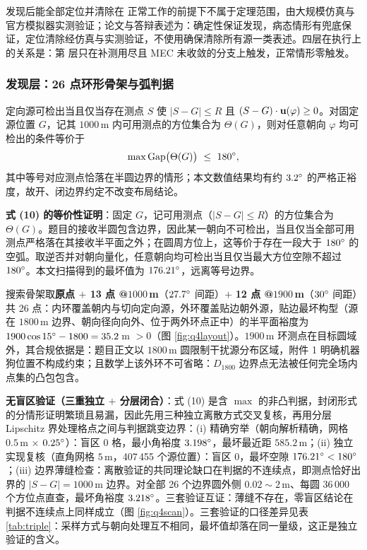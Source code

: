 \documentclass[12pt,a4paper]{ctexart}
\begin{document}
发现后能全部定位并清除在  正常工作的前提下不属于定理范围，由大规模仿真与官方模拟器实测验证；论文与答辩表述为：确定性保证发现，病态情形有兜底保证，定位清除经仿真与实测验证，不使用确保清除所有源一类表述。四层在执行上的关系是：第  层只在补测用尽且 MEC 未收敛的分支上触发，正常情形零触发。

\subsubsection{发现层：26 点环形骨架与弧判据}

定向源可检出当且仅当存在测点 $S$ 使 $|S-G|\le R$ 且 $(S-G)\cdot\mathbf{u}(\varphi)\ge 0$。对固定源位置 $G$，记其 $1000\,$m 内可用测点的方位集合为 $\Theta(G)$，则对任意朝向 $\varphi$ 均可检出的条件等价于
\begin{equation}
  \maxGap\bigl(\Theta(G)\bigr)\ \le\ 180\degr,
\end{equation}
其中等号对应测点恰落在半圆边界的情形；本文数值结果均有约 $3.2^{\circ}$ 的严格正裕度，故开、闭边界约定不改变布局结论。

\textbf{式 (10) 的等价性证明}：固定 $G$，记可用测点（$|S-G|\le R$）的方位集合为 $\Theta(G)$。题目的接收半圆包含边界，因此某一朝向不可检出，当且仅当全部可用测点严格落在其接收半平面之外；在圆周方位上，这等价于存在一段大于 $180^{\circ}$ 的空弧。取逆否并对朝向量化，任意朝向均可检出当且仅当最大方位空隙不超过 $180^{\circ}$。本文扫描得到的最坏值为 $176.21^{\circ}$，远离等号边界。

搜索骨架取\textbf{原点 $+$ 13 点 @$1000\,$m}（$27.7^{\circ}$ 间距）$+$ \textbf{12 点 @$1900\,$m}（$30^{\circ}$ 间距）共 26 点：内环覆盖朝内与切向定向源，外环覆盖贴边朝外源，贴边最坏构型（源在 $1800\,$m 边界、朝向径向向外、位于两外环点正中）的半平面裕度为 $1900\cos 15^{\circ}-1800=35.2\,$m $>0$（图 \ref{fig:q4layout}）。$1900\,$m 环测点在目标圆域外，其合规依据是：题目正文以 $1800\,$m 圆限制干扰源分布区域，附件 1 明确机器狗位置不构成约束；且数学上该外环不可省略：$D_{1800}$ 边界点无法被任何完全场内点集的凸包包含。

\textbf{无盲区验证（三重独立 $+$ 分层闭合）}：式 (10) 是含 $\max$ 的非凸判据，封闭形式的分情形证明繁琐且易漏，因此先用三种独立离散方式交叉复核，再用分层 Lipschitz 界处理格点之间与判据跳变边界：(i) 精确穷举（朝向解析精确，网格 $0.5\,$m $\times$ $0.25^{\circ}$）：盲区 0 格，最小角裕度 $3.198^{\circ}$，最坏最近距 $585.2\,$m；(ii) 独立实现复核（直角网格 $5\,$m，407\,455 个源位置）：盲区 0，最坏空隙 $176.21^{\circ}<180^{\circ}$；(iii) 边界薄缝检查：离散验证的共同理论缺口在判据的不连续点，即测点恰好出界的 $|S-G|=1000\,$m 边界。对全部 26 个边界圆外侧 $0.02\sim 2\,$m、每圆 36\,000 个方位点直查，最坏角裕度 $3.218^{\circ}$。三套验证互证：薄缝不存在，零盲区结论在判据不连续点上同样成立（图 \ref{fig:q4scan}）。三套验证的口径差异见表 \ref{tab:triple}：采样方式与朝向处理互不相同，最坏值却落在同一量级，这正是独立验证的含义。
\end{document}
